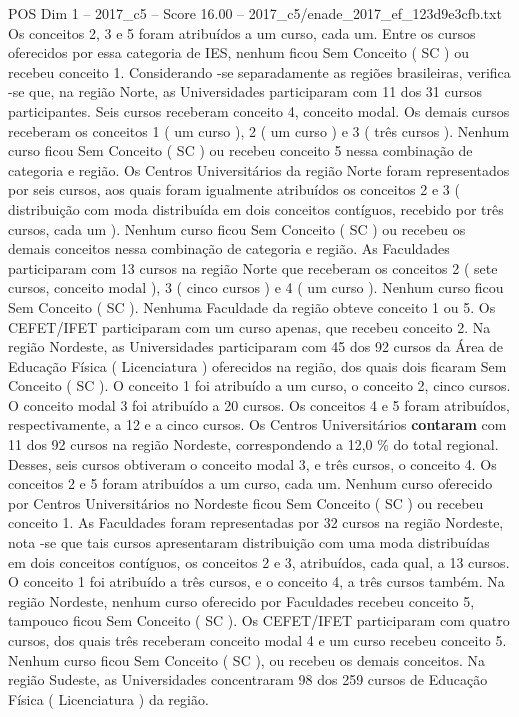 \begin{textsample}{POS Dim 1 – 2017\_c5 – Score 16.00 – 2017\_c5/enade\_2017\_ef\_123d9e3cfb.txt}
Os conceitos 2, 3 e 5 foram atribuídos a um curso, cada um.
Entre os cursos oferecidos por essa categoria de IES, nenhum ficou Sem Conceito ( SC ) ou recebeu conceito 1.
Considerando -se separadamente as regiões brasileiras, verifica -se que, na região Norte, as Universidades participaram com 11 dos 31 cursos participantes.
Seis cursos receberam conceito 4, conceito modal.
Os demais cursos receberam os conceitos 1 ( um curso ), 2 ( um curso ) e 3 ( três cursos ).
Nenhum curso ficou Sem Conceito ( SC ) ou recebeu conceito 5 nessa combinação de categoria e região.
Os Centros Universitários da região Norte foram representados por seis cursos, aos quais foram igualmente atribuídos os conceitos 2 e 3 ( distribuição com moda distribuída em dois conceitos contíguos, recebido por três cursos, cada um ).
Nenhum curso ficou Sem Conceito ( SC ) ou recebeu os demais conceitos nessa combinação de categoria e região.
As Faculdades participaram com 13 cursos na região Norte que receberam os conceitos 2 ( sete cursos, conceito modal ), 3 ( cinco cursos ) e 4 ( um curso ).
Nenhum curso ficou Sem Conceito ( SC ).
Nenhuma Faculdade da região obteve conceito 1 ou 5.
Os CEFET/IFET participaram com um curso apenas, que recebeu conceito 2.
Na região Nordeste, as Universidades participaram com 45 dos 92 cursos da Área de Educação Física ( Licenciatura ) oferecidos na região, dos quais dois ficaram Sem Conceito ( SC ).
O conceito 1 foi atribuído a um curso, o conceito 2, cinco cursos.
O conceito modal 3 foi atribuído a 20 cursos.
Os conceitos 4 e 5 foram atribuídos, respectivamente, a 12 e a cinco cursos.
Os Centros Universitários \textbf{contaram} com 11 dos 92 cursos na região Nordeste, correspondendo a 12,0 \% do total regional.
Desses, seis cursos obtiveram o conceito modal 3, e três cursos, o conceito 4.
Os conceitos 2 e 5 foram atribuídos a um curso, cada um.
Nenhum curso oferecido por Centros Universitários no Nordeste ficou Sem Conceito ( SC ) ou recebeu conceito 1.
As Faculdades foram representadas por 32 cursos na região Nordeste, nota -se que tais cursos apresentaram distribuição com uma moda distribuídas em dois conceitos contíguos, os conceitos 2 e 3, atribuídos, cada qual, a 13 cursos.
O conceito 1 foi atribuído a três cursos, e o conceito 4, a três cursos também.
Na região Nordeste, nenhum curso oferecido por Faculdades recebeu conceito 5, tampouco ficou Sem Conceito ( SC ).
Os CEFET/IFET participaram com quatro cursos, dos quais três receberam conceito modal 4 e um curso recebeu conceito 5.
Nenhum curso ficou Sem Conceito ( SC ), ou recebeu os demais conceitos.
Na região Sudeste, as Universidades concentraram 98 dos 259 cursos de Educação Física ( Licenciatura ) da região.

\end{textsample}
